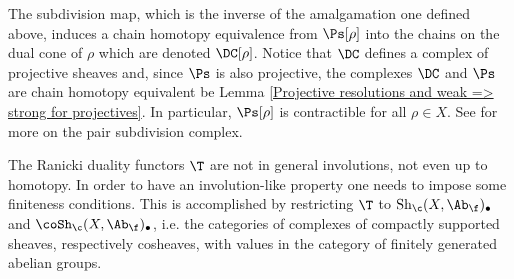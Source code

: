 \documentclass[thesis.tex]{subfiles}
\begin{document}
\begin{remark}
The subdivision map, which is the inverse of the amalgamation one defined above, induces a chain homotopy equivalence from $\Ps[\rho]$ into the chains on the dual cone of $\rho$ which are denoted $\DC[\rho]$. Notice that $\DC$ defines a complex of projective sheaves and, since $\Ps$ is also projective, the complexes $\DC$ and $\Ps$ are chain homotopy equivalent be Lemma \ref{Projective resolutions and weak => strong for projectives}. In particular, $\Ps[\rho]$ is contractible for all $\rho\in X$. See \cite{Rou10} for more on the pair subdivision complex.
\end{remark}

The Ranicki duality functors $\T$ are not in general involutions, not even up to homotopy. In order to have an involution-like property one needs to impose some finiteness conditions. This is accomplished by restricting $\T$ to $\Sh_{\c}(X,\Ab_{\f})_\bullet$ and $\coSh_{\c}(X,\Ab_{\f})_\bullet$, i.e. the categories of complexes of compactly supported sheaves, respectively cosheaves, with values in the category of finitely generated abelian groups.
\end{document}
